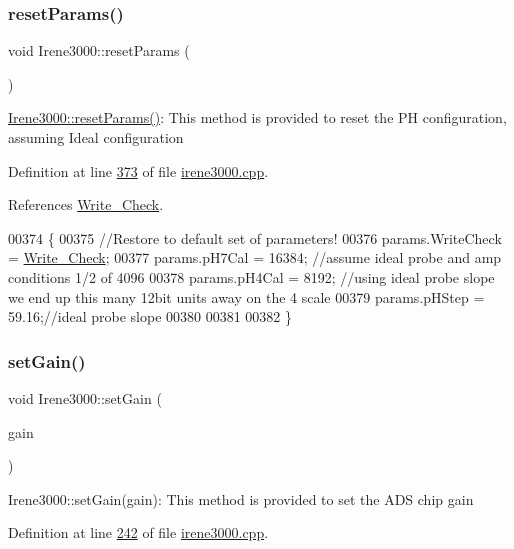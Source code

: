 \subsubsection{\texorpdfstring{reset\+Params()}{resetParams()}}
{\footnotesize\ttfamily void Irene3000\+::reset\+Params (\begin{DoxyParamCaption}\item[{void}]{ }\end{DoxyParamCaption})}

\hyperlink{class_irene3000_a0fba280e8b7c881307efa31281aa691d}{Irene3000\+::reset\+Params()}\+: This method is provided to reset the PH configuration, assuming Ideal configuration 

Definition at line \hyperlink{irene3000_8cpp_source_l00373}{373} of file \hyperlink{irene3000_8cpp_source}{irene3000.\+cpp}.



References \hyperlink{_irene3000_8h_source_l00022}{Write\+\_\+\+Check}.


\begin{DoxyCode}
00374 \{
00375   \textcolor{comment}{//Restore to default set of parameters!}
00376   params.WriteCheck = \hyperlink{_irene3000_8h_a9fa3b8fd890fde289060ee254cd273d5}{Write\_Check};
00377   params.pH7Cal = 16384; \textcolor{comment}{//assume ideal probe and amp conditions 1/2 of 4096}
00378   params.pH4Cal = 8192; \textcolor{comment}{//using ideal probe slope we end up this many 12bit units away on the 4 scale}
00379   params.pHStep = 59.16;\textcolor{comment}{//ideal probe slope}
00380 
00381   
00382 \}
\end{DoxyCode}
\mbox{\label{class_irene3000_aff7c5da186b388e7272e63ff88a20c34}} 
\subsubsection{\texorpdfstring{set\+Gain()}{setGain()}}
{\footnotesize\ttfamily void Irene3000\+::set\+Gain (\begin{DoxyParamCaption}\item[{ads\+Gain\+\_\+t}]{gain }\end{DoxyParamCaption})}

Irene3000\+::set\+Gain(gain)\+: This method is provided to set the A\+DS chip gain 

Definition at line \hyperlink{irene3000_8cpp_source_l00242}{242} of file \hyperlink{irene3000_8cpp_source}{irene3000.\+cpp}.



